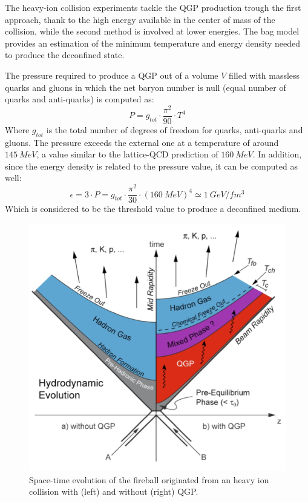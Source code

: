 The heavy-ion collision experiments tackle the QGP production  trough the first approach, thank to the high energy available in the center of mass of the collision, while the second method is involved at lower energies.
The bag model provides an estimation of the minimum temperature and energy density needed to produce the deconfined state.

The pressure required to produce a QGP out of a volume $V$ filled with massless quarks and gluons in which the net baryon number is null (equal number of quarks and anti-quarks) is computed as:
\begin{equation}
P = g_{tot}\cdot\frac{\pi^2}{90}\cdot T^4
\end{equation}
Where $g_{tot}$ is the total number of degrees of freedom for quarks, anti-quarks and gluons.
The pressure exceeds the external one at a temperature of around $145\ MeV$, a value similar to the lattice-QCD prediction of $160\ MeV$.
In addition, since the energy density is related to the pressure value, it can be computed as well:
\begin{equation}
\epsilon = 3\cdot P = g_{tot}\cdot\frac{\pi^2}{30}\cdot (160\ MeV)^4 \simeq 1\ GeV/fm^3
\end{equation}
Which is considered to be the threshold value to produce a deconfined medium.

\begin{figure}[!t]
\begin{center}
\includegraphics[width=0.85\linewidth]{Chapters/Introduction/Figs/QGP_evo.png}
\caption{Space-time evolution of the fireball originated from an heavy ion collision with (left) and without (right) QGP.}
\label{fig:evolution}
\end{center}
\end{figure}

